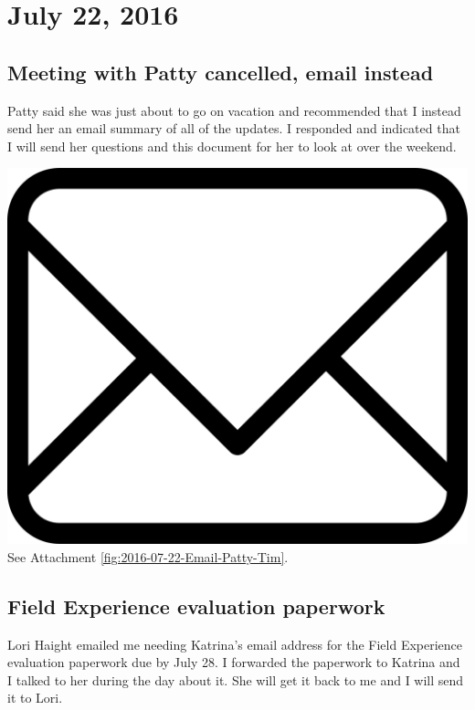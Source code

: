 \documentclass{article}
\begin{document}
\section{July 22, 2016}
\subsection{Meeting with Patty cancelled, email instead}
Patty said she was just about to go on vacation and recommended that I instead send her an email summary of all of the updates. I responded and indicated that I will send her questions and this document for her to look at over the weekend.

\vspace{2em}
\noindent\includegraphics[height=\fontcharht\font`\B]{icons/attachment-email} See Attachment \ref{fig:2016-07-22-Email-Patty-Tim}.
\vspace{2em}

\subsection{Field Experience evaluation paperwork}
Lori Haight emailed me needing Katrina's email address for the Field Experience evaluation paperwork due by July 28. I forwarded the paperwork to Katrina and I talked to her during the day about it. She will get it back to me and I will send it to Lori.
\end{document}
